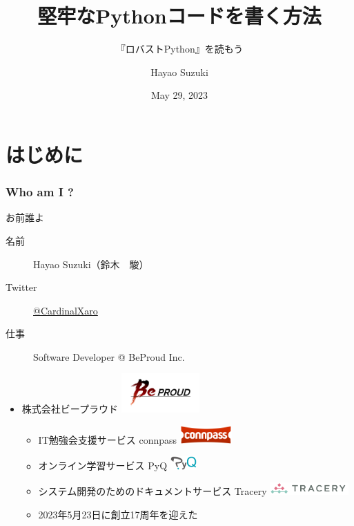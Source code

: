 \documentclass[aspectratio=169,dvipdfmx,12pt,notheorems]{beamer}
\title{堅牢なPythonコードを書く方法}
\subtitle{『ロバストPython』を読もう}
\author[Hayao]{Hayao Suzuki}
\institute[BPStudy\#189]{BPStudy\#189}
\date{May 29, 2023}
\theoremstyle{definition}
\begin{document}
\begin{frame}[plain]\frametitle{}
\titlepage %
\end{frame}

\section{はじめに}

\begin{frame}\frametitle{Who am I ?}

\begin{block}{お前誰よ}
\begin{description}
\item[名前] Hayao Suzuki（鈴木　駿）
\item[Twitter] \href{https://twitter.com/CardinalXaro}{@CardinalXaro}
\item[仕事] Software Developer @ BeProud Inc.
\end{description}
\end{block}

\begin{center}
\begin{itemize}
\item 株式会社ビープラウド \includegraphics[width=3cm]{bplogo.png}
\begin{itemize}
\item IT勉強会支援サービス connpass \includegraphics[width=2cm]{connpass_logo_1.png}
\item オンライン学習サービス PyQ \includegraphics[width=1cm]{pyq_logo_color.png}
\item システム開発のためのドキュメントサービス Tracery \includegraphics[width=3cm]{tracery.png}
\item 2023年5月23日に創立17周年を迎えた
\end{itemize}
\end{itemize}
\end{center}

\end{frame}
\end{document}
